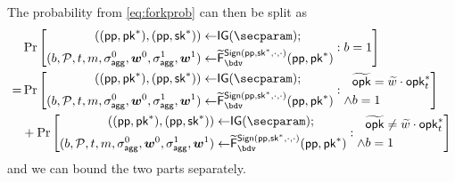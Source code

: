   The probability from \autoref{eq:forkprob} can then be split as
  \begin{equation}
  \begin{aligned}
    &\Pr\left[\begin{aligned}((\params,\pk^*),(\params,\sk^*)) \gets& \IG(\secparam);\\ (b,\pubkeys,t,m,\aggsig^0,\vec{w}^0,\aggsig^1,\vec{w}^1)\gets& \widetilde\fork^{\sign(\params,\sk^*,\cdot,\cdot)}_\bdv(\params,\pk^*)\end{aligned} : b=1 \right]\\
    =&\Pr\left[\begin{aligned}((\params,\pk^*),(\params,\sk^*)) \gets& \IG(\secparam);\\ (b,\pubkeys,t,m,\aggsig^0,\vec{w}^0,\aggsig^1,\vec{w}^1)\gets& \widetilde\fork^{\sign(\params,\sk^*,\cdot,\cdot)}_\bdv(\params,\pk^*)\end{aligned} : \begin{aligned} &\widetilde\opk = \widetilde w \cdot \opk^*_{t} \\ \land& b=1\end{aligned}\right]\\%
    &+\Pr\left[\begin{aligned}((\params,\pk^*),(\params,\sk^*)) \gets& \IG(\secparam);\\ (b,\pubkeys,t,m,\aggsig^0,\vec{w}^0,\aggsig^1,\vec{w}^1)\gets& \widetilde\fork^{\sign(\params,\sk^*,\cdot,\cdot)}_\bdv(\params,\pk^*)\end{aligned} :\begin{aligned} &\widetilde\opk \neq \widetilde w \cdot \opk^*_{t} \\ \land& b=1\end{aligned}\right]%
  \end{aligned}
  \end{equation}
  and we can bound the two parts separately.
  
